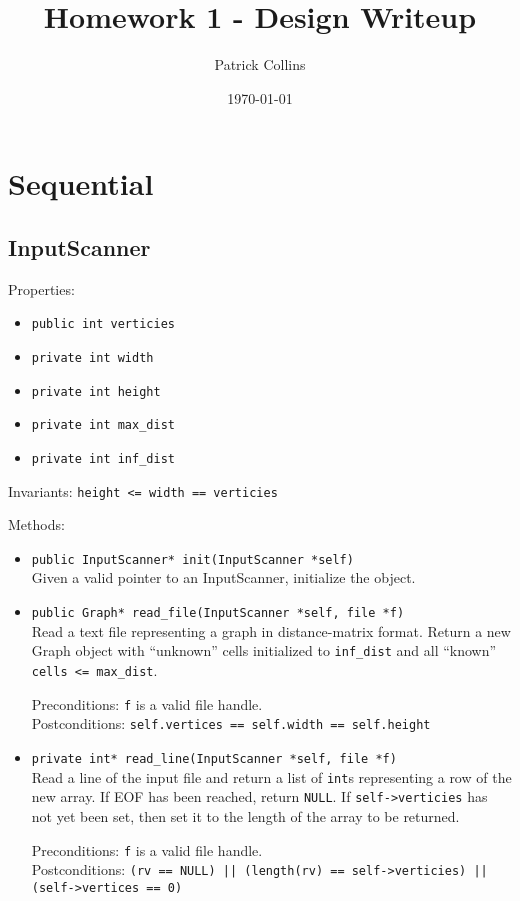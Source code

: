 \documentclass{article}
\begin{document}
\title{Homework 1 - Design Writeup}
\author{Patrick Collins}
\date{\today}
\maketitle

\section{Sequential} 

\subsection{InputScanner}
Properties:
\begin{itemize}
\item \texttt{public int verticies}
\item \texttt{private int width}
\item \texttt{private int height}
\item \texttt{private int max\_dist}
\item \texttt{private int inf\_dist}
\end{itemize}
Invariants: \texttt{height <= width == verticies}

Methods:
\begin{itemize}
\item \texttt{public InputScanner* init(InputScanner *self)}\\
Given a valid pointer to an InputScanner, initialize the object.

\item \texttt{public Graph* read\_file(InputScanner *self, file *f)}\\
Read a text file representing a graph in distance-matrix
format. Return a new Graph object with ``unknown'' cells initialized
to \texttt{inf\_dist} and all ``known'' \texttt{cells <= max\_dist}.

Preconditions: \texttt{f} is a valid file handle.\\
Postconditions: \texttt{self.vertices == self.width == self.height}

\item \texttt{private int* read\_line(InputScanner *self, file *f)}\\
Read a line of the input file and return a list of \texttt{int}s
representing a row of the new array. If EOF has been reached, return
\texttt{NULL}. If \texttt{self->verticies} has not yet been set, then set it to
the length of the array to be returned. 

Preconditions: \texttt{f} is a valid file handle.\\
Postconditions: \texttt{(rv == NULL) || (length(rv) == self->verticies) ||
  (self->vertices == 0)}

\end{itemize}



\end{document}
